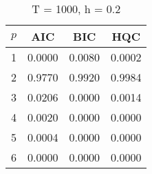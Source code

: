 \begin{table}[ht]
\captionsetup{justification=raggedright,singlelinecheck=false}
\caption*{T = 1000, h = 0.2}
\begin{tabular}{c|ccc}
  $p$ & AIC & BIC & HQC \\\hline
  1 & 0.0000 & 0.0080 & 0.0002 \\
  2 & 0.9770 & 0.9920 & 0.9984 \\
  3 & 0.0206 & 0.0000 & 0.0014 \\
  4 & 0.0020 & 0.0000 & 0.0000 \\
  5 & 0.0004 & 0.0000 & 0.0000 \\
  6 & 0.0000 & 0.0000 & 0.0000 \\
\end{tabular}
\end{table}
